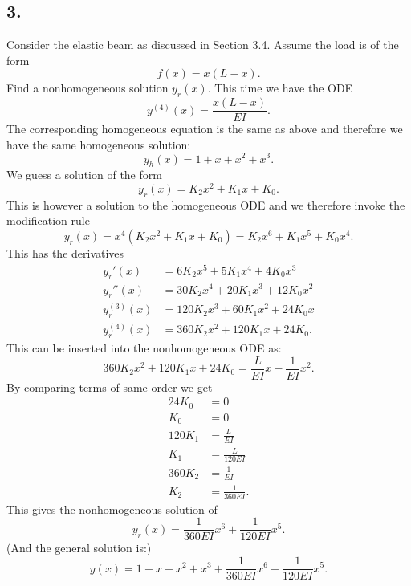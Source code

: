 \subsection*{3.} Consider the elastic beam as discussed in Section 3.4. Assume the load is of the form
\[ 
f(x) = x (L-x)
.\]
Find a nonhomogeneous solution $y_r(x)$.
\bigbreak
This time we have the ODE
\[ 
y^{(4)}(x) = \frac{x (L-x)}{EI}
.\]
The corresponding homogeneous equation is the same as above and therefore we have the same homogeneous solution:
\[ 
y_h(x) = 1 + x + x^2 + x^3
.\]
We guess a solution of the form
\[ 
y_r(x) = K_2 x^2 + K_1 x + K_0
.\]
This is however a solution to the homogeneous ODE and we therefore invoke the modification rule
\[ 
y_r(x) = x^{4} \left( K_2 x^2 + K_1 x + K_0 \right) = K_2 x^{6} + K_1 x^{5} + K_0 x^{4}
.\]
This has the derivatives
\begin{align*}
  y_r'(x) &= 6 K_2 x^{5} + 5 K_1 x^{4} + 4 K_0 x^{3} \\
  y_r''(x) &= 30 K_2 x^{4} + 20 K_1 x^{3} + 12 K_0 x^2 \\
  y_r^{(3)}(x) &= 120 K_2 x^3 + 60 K_1 x^2 + 24 K_0 x \\
  y_r^{(4)}(x) &= 360 K_2 x^2 + 120 K_1 x + 24 K_0
.\end{align*}
This can be inserted into the nonhomogeneous ODE as:
\[ 
360 K_2 x^2 + 120 K_1 x + 24 K_0 = \frac{L}{EI}x - \frac{1}{EI}x^2
.\]
By comparing terms of same order we get
\begin{align*}
  24K_0 &= 0 \\
  K_0 &= 0 \\
  120 K_1 &= \frac{L}{EI} \\
  K_1 &= \frac{L}{120 EI} \\
  360 K_2 &= \frac{1}{EI} \\
  K_2 &= \frac{1}{360 EI}
.\end{align*}
This gives the nonhomogeneous solution of
\[ 
y_r(x) = \frac{1}{360 EI} x^{6} + \frac{1}{120 EI} x^{5}
.\]
(And the general solution is:)
\[ 
y(x) = 1 + x + x^2 + x^3 + \frac{1}{360EI} x^{6} + \frac{1}{120EI} x^{5}
.\]


